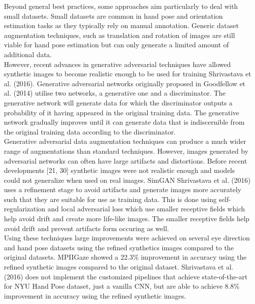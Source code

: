 \documentclass{article}
\begin{document}
Beyond general best practices, some approaches aim particularly to deal with small datasets. Small datasets are common in hand pose and orientation estimation tasks as they typically rely on manual annotation.  Generic dataset augmentation techniques, such as translation and rotation of images are still viable for hand pose estimation but can only generate a limited amount of additional data. \\

However, recent advances in generative adversarial techniques have allowed synthetic images to become realistic enough to be used for training Shrivastava et al. (2016). Generative adversarial networks originally proposed in Goodfellow et al. (2014) utilise two networks, a generative one and a discriminator. The generative network will generate data for which the discriminator outputs a probability of it having appeared in the original training data. The generative network gradually improves until it can generate data that is indiscernible from the original training data according to the discriminator. \\

Generative adversarial data augmentation techniques can produce a much wider range of augmentations than standard techniques. However, images generated by adversarial networks can often have large artifacts and distortions. Before recent developments [21, 30] synthetic images were not realistic enough and models could not generalize when used on real images. SimGAN Shrivastava et al. (2016) uses a refinement stage to avoid artifacts and generate images more accurately such that they are suitable for use as training data. This is done using self-regularization and local adversarial loss which use smaller receptive fields which help avoid drift and create more life-like images. The smaller receptive fields help avoid drift and prevent artifacts form occuring as well.\\

Using these techniques large improvements were achieved on several eye direction and hand pose datasets using the refined synthetics images compared to the original datasets. MPIIGaze showed a 22.3\% improvement in accuracy using the refined synthetic images compared to the original dataset. Shrivastava et al. (2016) does not implement the customized pipelines that achieve state-of-the-art for NYU Hand Pose dataset, just a vanilla CNN, but are able to achieve 8.8\% improvement in accuracy using the refined synthetic images.\\
\end{document}
